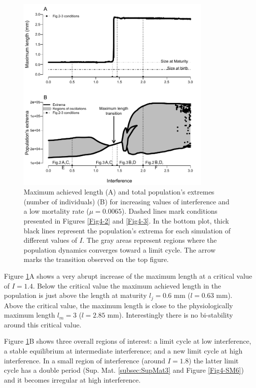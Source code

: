 \begin{figure}[!ht] %
\centering
\includegraphics[width=0.85\textwidth]{4_ChapThe1/Fig/Fig1.pdf}
\caption[Bifurcation over interference]{
Maximum achieved length (A) and total population's extremes (number of
individuals) (B) for increasing values of interference and a low mortality rate
($\mu=0.0065$). Dashed lines mark conditions presented in Figures \ref{Fig4-2}
and \ref{Fig4-3}.
In the bottom plot, thick black lines represent the population's extrema for
each simulation of different values of $I$. The gray areas represent regions
where the population dynamics converges toward a limit cycle. The arrow marks
the transition observed on the top figure.}
\label{Fig4-1}
\end{figure}

Figure \ref{Fig4-1}A shows a very abrupt increase of the maximum length at a
critical value of $I = 1.4$. Below the critical value the maximum achieved
length in the population is just above the length at maturity $l_j=0.6$ mm
($l=0.63$ mm). Above the critical value, the maximum length is close to the
physiologically maximum length $l_m=3$ ($l=2.85$ mm). Interestingly there is no
bi-stability around this critical value.

Figure \ref{Fig4-1}B shows three overall regions of interest: a limit cycle at
low interference, a stable equilibrium at intermediate interference; and a new
limit cycle at high interference. In a small region of interference (around $I =
1.8$) the latter limit cycle has a double period (Sup. Mat. \ref{subsec:SupMat3} and
Figure \ref{Fig4-SM6}) and it becomes irregular at high interference.

